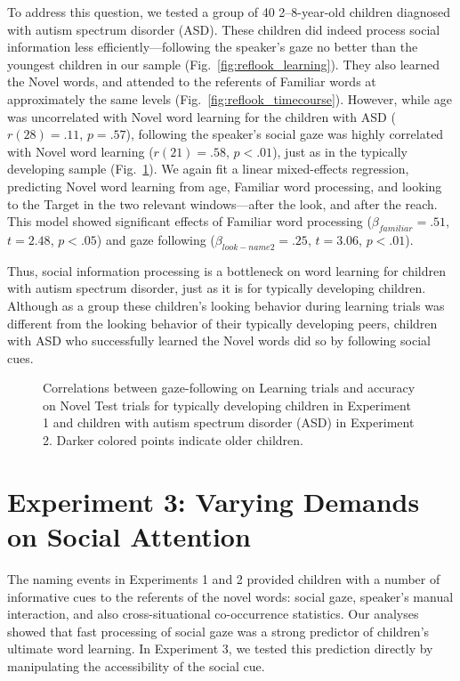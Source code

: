\documentclass[man,floatsintext]{apa6}
\begin{document}
To address this question, we tested a group of 40 2--8-year-old children diagnosed with autism spectrum disorder (ASD). These children did indeed process social information less efficiently---following the speaker's gaze no better than the youngest children in our sample (Fig.~\ref{fig:reflook_learning}). They also learned the Novel words, and attended to the referents of Familiar words at approximately the same levels (Fig.~\ref{fig:reflook_timecourse}). However, while age was uncorrelated with Novel word learning for the children with ASD ($r(28) = .11$, $p =.57$), following the speaker's social gaze was highly correlated with Novel word learning ($r(21) = .58$, $p <.01$), just as in the typically developing sample (Fig.~\ref{fig:corr_plot}). We again fit a linear mixed-effects regression, predicting Novel word learning from age, Familiar word processing, and looking to the Target in the two relevant windows---after the look, and after the reach. This model showed significant effects of Familiar word processing ($\beta_{familiar} = .51$, $t = 2.48$, $p < . 05$) and gaze following ($\beta_{look-name2} = .25$, $t = 3.06$, $p < .01$).

Thus, social information processing is a bottleneck on word learning for children with autism spectrum disorder, just as it is for typically developing children. Although as a group these children's looking behavior during learning trials was different from the looking behavior of their typically developing peers, children with ASD who successfully learned the Novel words did so by following social cues.

\begin{figure}[tb]
	\caption{\label{fig:corr_plot}Correlations between gaze-following on Learning trials and accuracy on Novel Test trials for typically developing children in Experiment 1 and children with autism spectrum disorder (ASD) in Experiment 2. Darker colored points indicate older children.}

\end{figure}

\section{Experiment 3: Varying Demands on Social Attention}

The naming events in Experiments 1 and 2 provided children with a number of informative cues to the referents of the novel words: social gaze, speaker's manual interaction, and also cross-situational co-occurrence statistics. Our analyses showed that fast processing of social gaze was a strong predictor of children's ultimate word learning. In Experiment 3, we tested this prediction directly by manipulating the accessibility of the social cue.
\end{document}
